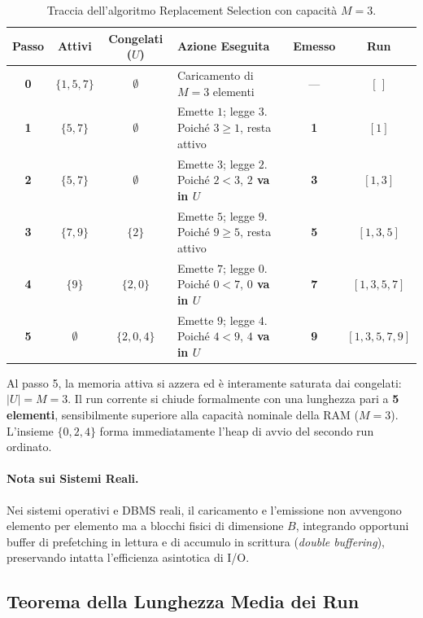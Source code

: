 \begin{table}[H]
  \centering
  \caption{Traccia dell'algoritmo Replacement Selection con capacità $M=3$.}
  \label{tab:snow-plow-trace}
  \small
  \setlength{\tabcolsep}{4pt}
  \begin{tabularx}{\textwidth}{c c c Y c c}
    \toprule
    \textbf{Passo} & \textbf{Attivi} & \textbf{Congelati ($U$)} & \textbf{Azione Eseguita} & \textbf{Emesso} & \textbf{Run} \\
    \midrule
    \textbf{0} & $\{1, 5, 7\}$ & $\emptyset$ & Caricamento di $M=3$ elementi & — & $[\,]$ \\
    \textbf{1} & $\{5, 7\}$ & $\emptyset$ & Emette $1$; legge $3$. Poiché $3 \ge 1$, resta attivo & \textbf{1} & $[1]$ \\
    \textbf{2} & $\{5, 7\}$ & $\emptyset$ & Emette $3$; legge $2$. Poiché $2 < 3$, \textbf{$2$ va in $U$} & \textbf{3} & $[1, 3]$ \\
    \textbf{3} & $\{7, 9\}$ & $\{2\}$ & Emette $5$; legge $9$. Poiché $9 \ge 5$, resta attivo & \textbf{5} & $[1, 3, 5]$ \\
    \textbf{4} & $\{9\}$ & $\{2, 0\}$ & Emette $7$; legge $0$. Poiché $0 < 7$, \textbf{$0$ va in $U$} & \textbf{7} & $[1, 3, 5, 7]$ \\
    \textbf{5} & $\emptyset$ & $\{2, 0, 4\}$ & Emette $9$; legge $4$. Poiché $4 < 9$, \textbf{$4$ va in $U$} & \textbf{9} & $[1, 3, 5, 7, 9]$ \\
    \bottomrule
  \end{tabularx}
\end{table}

Al passo 5, la memoria attiva si azzera ed è interamente saturata dai congelati: $\vert{}U\vert{} = M = 3$. Il run corrente si chiude formalmente con una lunghezza pari a \textbf{5 elementi}, sensibilmente superiore alla capacità nominale della RAM ($M = 3$). L'insieme $\{0, 2, 4\}$ forma immediatamente l'heap di avvio del secondo run ordinato.

\paragraph{Nota sui Sistemi Reali.}
Nei sistemi operativi e DBMS reali, il caricamento e l'emissione non avvengono elemento per elemento ma a blocchi fisici di dimensione $B$, integrando opportuni buffer di prefetching in lettura e di accumulo in scrittura (\textit{double buffering}), preservando intatta l'efficienza asintotica di I/O.

\subsection{Teorema della Lunghezza Media dei Run}
\label{subsec:snow-plow-theorem}

